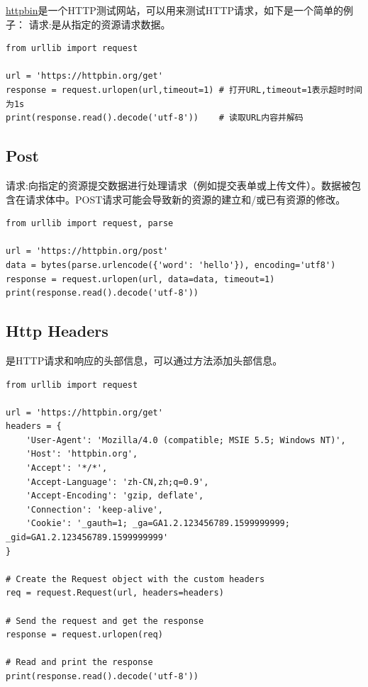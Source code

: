 \href{https://httpbin.org/}{httpbin}是一个HTTP测试网站，可以用来测试HTTP请求，如下是一个简单的例子：
请求:是从指定的资源请求数据。
\begin{lstlisting}[style=demostyle,numbers=none]
from urllib import request

url = 'https://httpbin.org/get'
response = request.urlopen(url,timeout=1) # 打开URL,timeout=1表示超时时间为1s
print(response.read().decode('utf-8'))    # 读取URL内容并解码
\end{lstlisting}

\subsection{Post}
请求:向指定的资源提交数据进行处理请求（例如提交表单或上传文件）。数据被包含在请求体中。POST请求可能会导致新的资源的建立和/或已有资源的修改。

\begin{lstlisting}[style=demostyle,numbers=none]
from urllib import request, parse

url = 'https://httpbin.org/post'
data = bytes(parse.urlencode({'word': 'hello'}), encoding='utf8')
response = request.urlopen(url, data=data, timeout=1)
print(response.read().decode('utf-8'))
\end{lstlisting}

\subsection{Http Headers}
是HTTP请求和响应的头部信息，可以通过方法添加头部信息。

\begin{lstlisting}[style=demostyle,numbers=none]
from urllib import request

url = 'https://httpbin.org/get'
headers = {
    'User-Agent': 'Mozilla/4.0 (compatible; MSIE 5.5; Windows NT)',
    'Host': 'httpbin.org',
    'Accept': '*/*',
    'Accept-Language': 'zh-CN,zh;q=0.9',
    'Accept-Encoding': 'gzip, deflate',
    'Connection': 'keep-alive',
    'Cookie': '_gauth=1; _ga=GA1.2.123456789.1599999999; _gid=GA1.2.123456789.1599999999'
}

# Create the Request object with the custom headers
req = request.Request(url, headers=headers)

# Send the request and get the response
response = request.urlopen(req)

# Read and print the response
print(response.read().decode('utf-8'))
\end{lstlisting}

